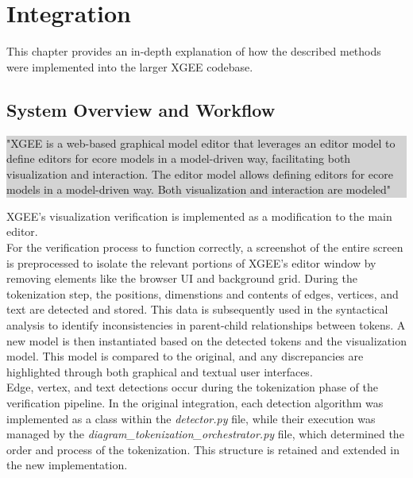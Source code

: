 \chapter{Integration}
\label{chap_Integration}
This chapter provides an in-depth explanation of how the described methods were implemented into the larger XGEE codebase.

\section{System Overview and Workflow}
\colorbox{lightgray}{%
  \parbox{\dimexpr\linewidth-2\fboxsep}{%
  "XGEE is a web-based graphical model editor that leverages an editor model to define editors for ecore models in a model-driven way, facilitating both visualization and interaction. The editor model allows defining editors for ecore models in a model-driven way. Both visualization and interaction are modeled" \cite{og_paper}%
  }%
}

XGEE's visualization verification is implemented as a modification to the main editor.\\
For the verification process to function correctly, a screenshot of the entire screen is preprocessed to isolate the relevant portions of XGEE's editor window by removing elements like the browser UI and background grid. During the tokenization step, the positions, dimenstions and contents of edges, vertices, and text are detected and stored. This data is subsequently used in the syntactical analysis to identify inconsistencies in parent-child relationships between tokens. A new model is then instantiated based on the detected tokens and the visualization model. This model is compared to the original, and any discrepancies are highlighted through both graphical and textual user interfaces.\\
Edge, vertex, and text detections occur during the tokenization phase of the verification pipeline. In the original integration, each detection algorithm was implemented as a class within the \textit{detector.py} file, while their execution was managed by the \textit{diagram\_tokenization\_orchestrator.py} file, which determined the order and process of the tokenization. This structure is retained and extended in the new implementation.

